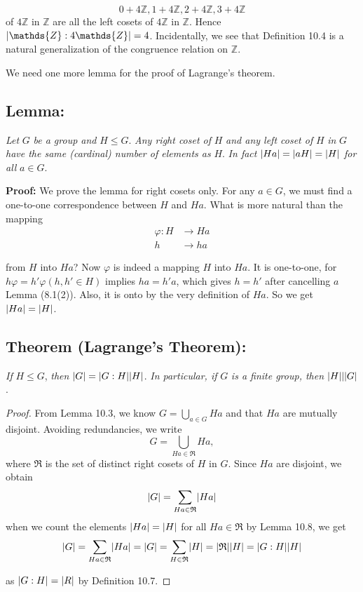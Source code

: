 \documentclass[11pt]{amsbook}
\DeclarePairedDelimiter{\abs}{\lvert}{\rvert}
\begin{document}
\[
    0 + 4\mathds{Z}, 1 + 4 \mathds{Z}, 2 + 4\mathds{Z}, 3 + 4\mathds{Z}
\]
of $4 \mathds{Z}$ in $\mathds{Z}$ are all the left cosets of $4\mathds{Z}$ in $\mathds{Z}$. Hence $\abs{\mathds{Z}:4\mathds{Z}} = 4$. Incidentally, we see that Definition 10.4 is a natural generalization of the congruence relation on $\mathds{Z}$. 

We need one more lemma for the proof of Lagrange's theorem. 




\subsection{Lemma:} \textit{Let} $G$ \textit{be a group and } $H \leq G$. \textit{Any right coset of }$H$\textit{ and any left coset of }$H$ \textit{in }$G$ \textit{have the same (cardinal) number of elements as }$H$. \textit{In fact } $\abs{H a} = \abs{a H} = \abs{H}$ \textit{for all} $a \in G$.

\textbf{Proof:} We prove the lemma for right cosets only. For any $a \in G$, we must find a one-to-one correspondence between $H$ and $H a$. What is more natural than the mapping 
\begin{align*}
        \varphi:H &\rightarrow H a\\
        h &\rightarrow h a
\end{align*}

from $H$ into $H a$? Now $\varphi$ is indeed a mapping $H$ into $H a$. It is one-to-one, for $h \varphi = h'\varphi (h,h' \in H)$ implies $h a = h' a$, which gives $h = h'$ after cancelling $a$ Lemma (8.1(2)). Also, it is onto by the very definition of $H a$. So we get $\abs{H a} = \abs{H}$.

\subsection{Theorem (Lagrange's Theorem):} \textit{If} $H \leq G$, \textit{then} $\abs{G} = \abs{G:H} \abs{H} $. \textit{In particular, if} $G$ \textit{is a finite group, then} $\abs{H} | \abs{G}$.
\begin{proof}
 From Lemma 10.3, we know $ G = \bigcup\limits_{a \in G} H a$ and that $ H a $ are mutually disjoint. Avoiding redundancies,  we write 
\[
    G = \bigcup\limits_{H a \in \mathfrak{R}} H a,
\]
where $\mathfrak{R}$ is the set of distinct right cosets of $H$ in $G$. Since $H a$ are disjoint, we obtain
\[
    \abs{G} = \sum_{H a \in \mathfrak{R}}\abs{H a}
\]
when we count the elements $\abs{H a } = \abs{H} $ for all $H a \in \mathfrak{R}$ by Lemma 10.8, we get
\[
    \abs{G} = \sum\limits_{H a \in \mathfrak{R}} \abs{H a} = \abs{G} = \sum\limits_{H \in \mathfrak{R}} \abs{H} = \abs{\mathfrak{R}} \abs{H} = \abs{G:H} \abs{H}
\]

as $\abs{G:H} = \abs{R}$ by Definition 10.7.
\end{proof}


\end{document}
